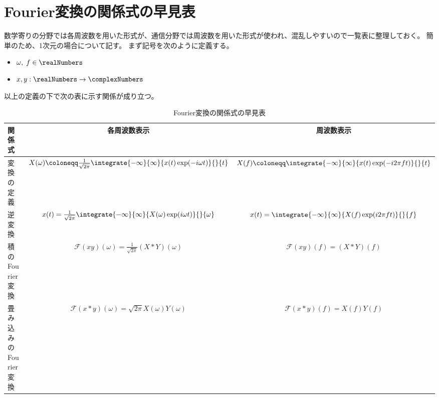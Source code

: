     \section{Fourier変換の関係式の早見表}
        数学寄りの分野では各周波数を用いた形式が、通信分野では周波数を用いた形式が使われ、混乱しやすいので一覧表に整理しておく。
        簡単のため、1次元の場合について記す。
        まず記号を次のように定義する。
        \begin{itemize}
            \item $\omega,\;f\in\realNumbers$
            \item $x,y:\realNumbers\to\complexNumbers$
        \end{itemize}
        以上の定義の下で次の表に示す関係が成り立つ。
        \begin{table}[H]
            \centering
            \caption{Fourier変換の関係式の早見表}
            \begin{tabular}[H]{l|c|c}
                関係式 & 各周波数表示 & 周波数表示 \\ \hline
                変換の定義 & $X(\omega) \coloneqq \frac{1}{\sqrt{2\pi}}\integrate{-\infty}{\infty}{x(t)\exp(-i\omega t)}{}{t}$ & $X(f) \coloneqq \integrate{-\infty}{\infty}{x(t)\exp(-i2\pi f t)}{}{t}$ \\
                逆変換 & $x(t) = \frac{1}{\sqrt{2\pi}}\integrate{-\infty}{\infty}{X(\omega)\exp(i\omega t)}{}{\omega}$ & $x(t) = \integrate{-\infty}{\infty}{X(f)\exp(i2\pi f t)}{}{f}$ \\
                積のFourier変換 & $\mathcal{F}(xy)(\omega) = \frac{1}{\sqrt{2\pi}}(X*Y)(\omega)$ & $\mathcal{F}(xy)(f) = (X*Y)(f)$ \\
                畳み込みのFourier変換 & $\mathcal{F}(x*y)(\omega) = \sqrt{2\pi}X(\omega)Y(\omega)$ & $\mathcal{F}(x*y)(f) = X(f)Y(f)$
            \end{tabular}
        \end{table}